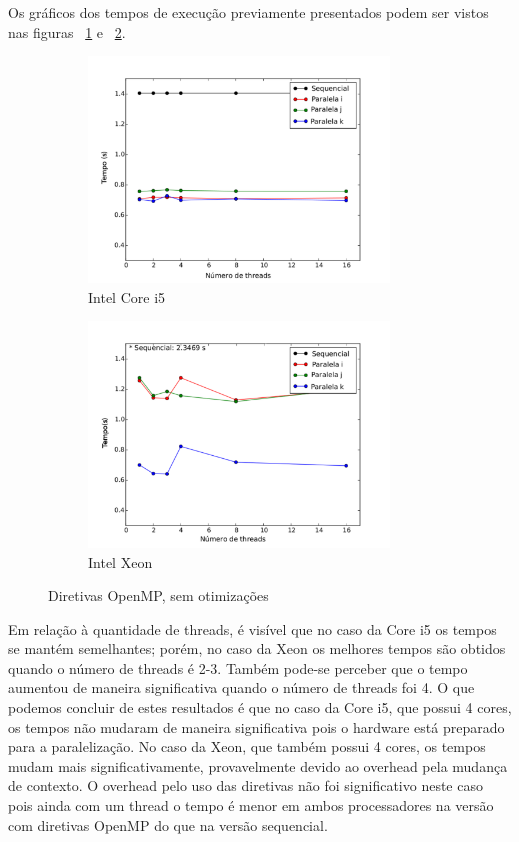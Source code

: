 \documentclass[a4paper,12pt,fleqn]{article}
\begin{document}
Os gráficos dos tempos de execução previamente presentados podem ser vistos nas figuras ~\ref{fig:corei5so} e ~\ref{fig:xeonso}.
 
\begin{figure}[htb] 
    \centering
    \begin{subfigure}{.5\textwidth}
        \centering
        \includegraphics[height=6cm]{Images/corei5so} 
        \caption{Intel Core i5}
        \label{fig:corei5so} 
    \end{subfigure}%
    \begin{subfigure}{.5\textwidth}
        \centering
        \includegraphics[height=6cm]{Images/xeonso} 
        \caption{Intel Xeon}
        \label{fig:xeonso} 
    \end{subfigure}
    \caption{Diretivas OpenMP, sem otimizações}
    \label{fig:so}
\end{figure} 

Em relação à quantidade de threads, é visível que no caso da Core i5 os tempos se mantém semelhantes; porém, no caso da Xeon os melhores tempos são obtidos quando o número de threads é 2-3. Também pode-se perceber que o tempo aumentou de maneira significativa quando o número de threads foi 4. O que podemos concluir de estes resultados é que no caso da Core i5, que possui 4 cores, os tempos não mudaram de maneira significativa pois o hardware está preparado para a paralelização. No caso da Xeon, que também possui 4 cores, os tempos mudam mais significativamente, provavelmente devido ao overhead pela mudança de contexto. O overhead pelo uso das diretivas não foi significativo neste caso pois ainda com um thread o tempo é menor em ambos processadores na versão com diretivas OpenMP do que na versão sequencial.
\end{document}
